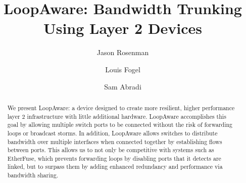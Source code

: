 \documentclass{article}
\title{LoopAware: Bandwidth Trunking Using Layer 2 Devices}
\author{Jason Rosenman \and Louis Fogel \and Sam Abradi}
\date{}
\begin{document}
\maketitle
\begin{abstract}
	We present LoopAware: a device designed to create more resilient, higher performance layer 2 infrastructure with little additional hardware.
	LoopAware accomplishes this goal by allowing multiple switch ports to be connected without the risk of forwarding loops or broadcast storms.
	In addition, LoopAware allows switches to distribute bandwidth over multiple interfaces when connected together by establishing flows between ports.
	This allows us to not only be competitive with systems such as EtherFuse, which prevents forwarding loops by disabling ports that it detects are linked, but to surpass them by adding enhanced redundancy and performance via bandwidth sharing.
\end{abstract}





\newpage


\end{document}
